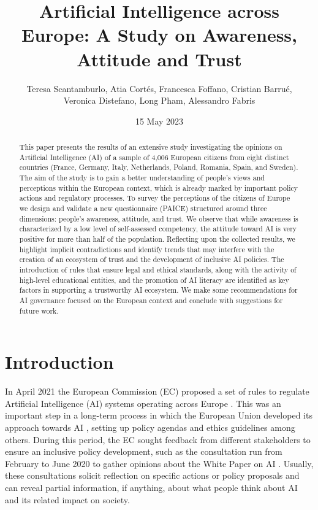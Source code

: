 \documentclass{article}
\title{Artificial Intelligence across Europe: A Study on Awareness, Attitude and Trust}
\author{Teresa Scantamburlo, Atia Cortés, Francesca Foffano, Cristian Barrué,\\ Veronica Distefano, Long Pham, Alessandro Fabris}
\date{15 May 2023}
\begin{document}
\maketitle

\begin{abstract}
This paper presents the results of an extensive study investigating the opinions on Artificial Intelligence (AI) of a sample of 4,006 European citizens from eight distinct countries (France, Germany, Italy, Netherlands, Poland, Romania, Spain, and Sweden). The aim of the study is to gain a better understanding of people’s views and perceptions within the European context, which is already marked by important policy actions and regulatory processes.
To survey the perceptions of the citizens of Europe we design and validate a new questionnaire (PAICE) structured around three dimensions: people's awareness, attitude, and trust. We observe that while awareness is characterized by a low level of self-assessed competency, the attitude toward AI is very positive for more than half of the population. Reflecting upon the collected results, we highlight implicit contradictions and identify trends that may interfere with the creation of an ecosystem of trust and the development of inclusive AI policies. The introduction of rules that ensure legal and ethical standards, along with the activity of high-level educational entities, and the promotion of AI literacy are identified as key factors in supporting a trustworthy AI ecosystem. We make some recommendations for AI governance focused on the European context and conclude with suggestions for future work.
\end{abstract}

\section{Introduction}
In April 2021 the European Commission (EC) proposed a set of rules to regulate Artificial Intelligence (AI) systems operating across Europe \cite{ai_act}. This was an important step in a long-term process in which the European Union developed its approach towards AI \cite{krarup2023european}, setting up policy agendas \cite{ai_agenda} and ethics guidelines \cite{Trustworthy_EU} among others. During this period, the EC sought feedback from different stakeholders to ensure an inclusive policy development, such as the consultation run from February to June 2020 to gather opinions about the White Paper on AI \cite{Whitepaper_EU}. Usually, these consultations solicit reflection on specific actions or policy proposals and can reveal partial information, if anything, about what people think about AI and its related impact on society. 
\end{document}
